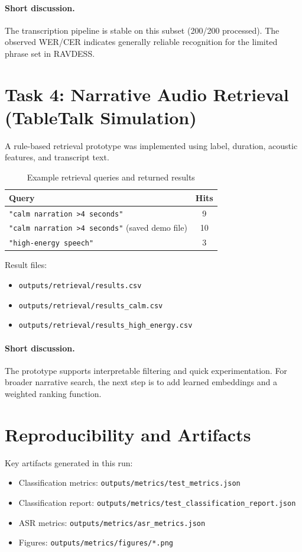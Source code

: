 \documentclass[11pt,a4paper]{article}
\begin{document}
\paragraph{Short discussion.}
The transcription pipeline is stable on this subset (200/200 processed).
The observed WER/CER indicates generally reliable recognition for the limited phrase set in RAVDESS.

\section{Task 4: Narrative Audio Retrieval (TableTalk Simulation)}
A rule-based retrieval prototype was implemented using label, duration, acoustic features, and transcript text.

\begin{table}[H]
\centering
\caption{Example retrieval queries and returned results}
\begin{tabular}{p{}c}
\toprule
Query & Hits \\
\midrule
\texttt{"calm narration >4 seconds"} & 9 \\
\texttt{"calm narration >4 seconds"} (saved demo file) & 10 \\
\texttt{"high-energy speech"} & 3 \\
\bottomrule
\end{tabular}
\end{table}

Result files:
\begin{itemize}
  \item \texttt{outputs/retrieval/results.csv}
  \item \texttt{outputs/retrieval/results\_calm.csv}
  \item \texttt{outputs/retrieval/results\_high\_energy.csv}
\end{itemize}

\paragraph{Short discussion.}
The prototype supports interpretable filtering and quick experimentation.
For broader narrative search, the next step is to add learned embeddings and a weighted ranking function.

\section{Reproducibility and Artifacts}
Key artifacts generated in this run:
\begin{itemize}
  \item Classification metrics: \texttt{outputs/metrics/test\_metrics.json}
  \item Classification report: \texttt{outputs/metrics/test\_classification\_report.json}
  \item ASR metrics: \texttt{outputs/metrics/asr\_metrics.json}
  \item Figures: \texttt{outputs/metrics/figures/*.png}
\end{itemize}
\end{document}
